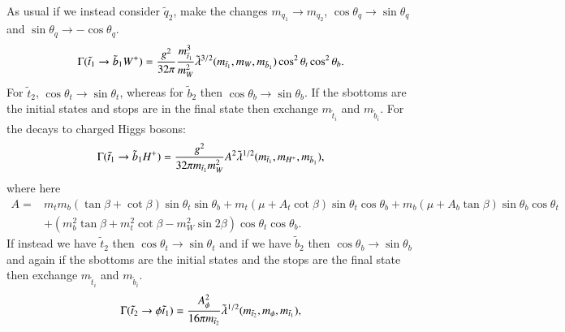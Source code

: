\documentclass[final,3p,times,pdflatex]{elsarticle}
\begin{document}
As usual if we instead consider $\tilde{q}_2$, make the changes $m_{q_1} \rightarrow m_{q_2}$, $\cos\theta_q \rightarrow \sin\theta_q$ and $\sin\theta_q \rightarrow -\cos\theta_q$.
\begin{equation}\label{t1b1W}
\begin{aligned}
\Gamma (\tilde{t}_1 \rightarrow \tilde{b}_1 W^+ ) = {g^2 \over 32\pi} {m_{\tilde{t}_1}^3 \over m_{W}^2} {\tilde{\lambda}^{3/2}}(m_{\tilde{t}_1},m_W,m_{\tilde{b}_1}) \cos^2\theta_t \cos^2\theta_b.
\end{aligned}
\end{equation} 
For $\tilde{t}_2$, $\cos\theta_t \rightarrow \sin\theta_t$, whereas for
$\tilde{b}_2$ then $\cos\theta_b \rightarrow \sin\theta_b$. 
If the sbottoms are the initial states and stops are in the final state then
exchange $m_{\tilde{t}_i}$ and $m_{\tilde{b}_i}$. 
For the decays to charged Higgs bosons:
\begin{equation}\label{t1b1Hpm}
\begin{aligned}
\Gamma (\tilde{t}_1 \rightarrow \tilde{b}_1 H^+ ) = {g^2 \over 32\pi m_{\tilde{t}_1} m_{W}^{2}} A^2 \tilde{\lambda}^{1/2} ( m_{\tilde{t}_1}, m_{H^+}, m_{\tilde{b}_1} ),
\end{aligned}
\end{equation} 
where here
\begin{equation}
\begin{aligned}
A = & m_t m_b (\tan\beta + \cot\beta)\sin\theta_t\sin\theta_b +  m_t(\mu + A_t \cot\beta)\sin\theta_t\cos\theta_b + m_b(\mu + A_b \tan\beta)\sin\theta_b\cos\theta_t \\ &  + (m_b^2 \tan\beta + m_t^2 \cot\beta - m_W^2 \sin2 \beta) \cos\theta_t\cos\theta_b.
\end{aligned}
\end{equation}
If instead we have $\tilde{t}_2$ then $\cos\theta_t \rightarrow \sin\theta_t$ and if we have $\tilde{b}_2$ then $\cos\theta_b \rightarrow \sin\theta_b$ and again if the sbottoms are the initial states and the stops are the final state then exchange $m_{\tilde{t}_i}$ and $m_{\tilde{b}_i}$.
\begin{equation}\label{t2t1phi}
\begin{aligned}
\Gamma (\tilde{t}_2 \rightarrow \phi \tilde{t}_1) = {A_{\phi}^2 \over 16\pi m_{\tilde{t}_2} } \tilde{\lambda}^{1/2} (m_{\tilde{t}_2}, m_\phi, m_{\tilde{t}_1}),
\end{aligned}
\end{equation} 
\end{document}
